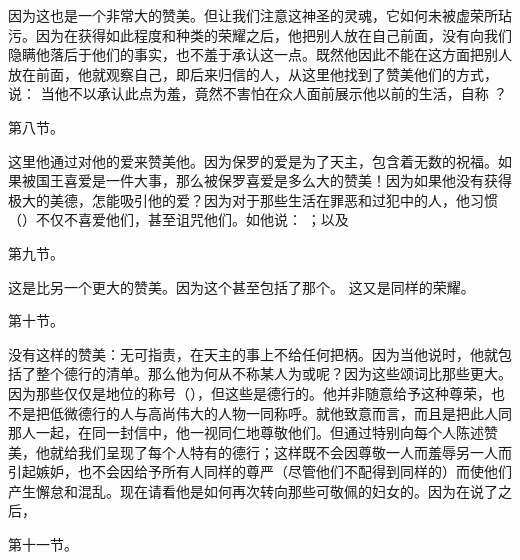 因为这也是一个非常大的赞美。但让我们注意这神圣的灵魂，它如何未被虚荣所玷污。因为在获得如此程度和种类的荣耀之后，他把别人放在自己前面，没有向我们隐瞒他落后于他们的事实，也不羞于承认这一点。既然他因此不能在这方面把别人放在前面，他就观察自己，即后来归信的人，从这里他找到了赞美他们的方式，说： 当他不以承认此点为羞，竟然不害怕在众人面前展示他以前的生活，自称 ？\par

第八节。 \par

这里他通过对他的爱来赞美他。因为保罗的爱是为了天主，包含着无数的祝福。如果被国王喜爱是一件大事，那么被保罗喜爱是多么大的赞美！因为如果他没有获得极大的美德，怎能吸引他的爱？因为对于那些生活在罪恶和过犯中的人，他习惯（）不仅不喜爱他们，甚至诅咒他们。如他说： ；以及 \par

第九节。 \par

这是比另一个更大的赞美。因为这个甚至包括了那个。 这又是同样的荣耀。\par

第十节。 \par

没有这样的赞美：无可指责，在天主的事上不给任何把柄。因为当他说时，他就包括了整个德行的清单。那么他为何从不称某人为或呢？因为这些颂词比那些更大。因为那些仅仅是地位的称号（），但这些是德行的。他并非随意给予这种尊荣，也不是把低微德行的人与高尚伟大的人物一同称呼。就他致意而言，而且是把此人同那人一起，在同一封信中，他一视同仁地尊敬他们。但通过特别向每个人陈述赞美，他就给我们呈现了每个人特有的德行；这样既不会因尊敬一人而羞辱另一人而引起嫉妒，也不会因给予所有人同样的尊严（尽管他们不配得到同样的）而使他们产生懈怠和混乱。现在请看他是如何再次转向那些可敬佩的妇女的。因为在说了之后，\par

第十一节。\par

